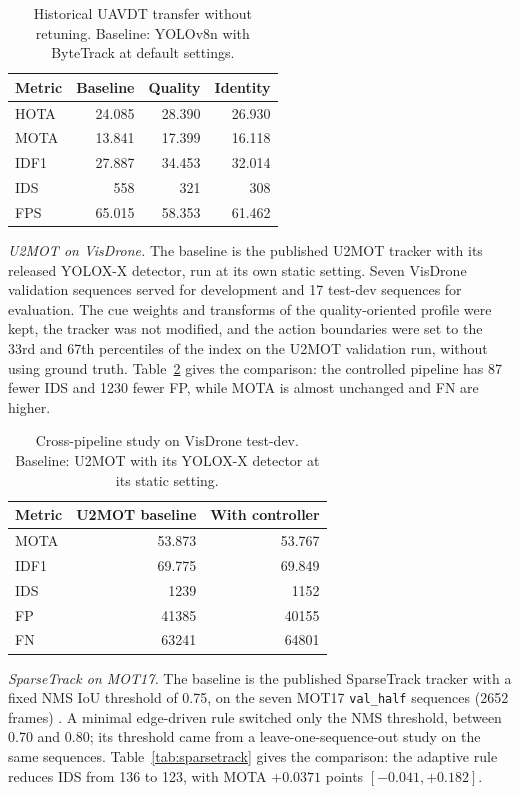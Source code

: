 \documentclass[journal]{new-aiaa}
\begin{document}
\begin{table}[htbp]
\caption{Historical UAVDT transfer without retuning. Baseline: YOLOv8n with
ByteTrack at default settings.}
\label{tab:hist-uavdt}
\centering\footnotesize
\setlength{\tabcolsep}{4pt}
\begin{tabular}{@{}lrrr@{}}
\toprule
Metric & Baseline & Quality & Identity\\
\midrule
HOTA & 24.085 & 28.390 & 26.930\\
MOTA & 13.841 & 17.399 & 16.118\\
IDF1 & 27.887 & 34.453 & 32.014\\
IDS & 558 & 321 & 308\\
FPS & 65.015 & 58.353 & 61.462\\
\bottomrule
\end{tabular}
\end{table}

\emph{U2MOT on VisDrone.} The baseline is the published U2MOT tracker
\cite{liu2023u2mot} with its released YOLOX-X detector, run
at its own static setting. Seven VisDrone validation sequences served for
development and 17 test-dev sequences for evaluation. The cue weights and
transforms of the quality-oriented profile were kept, the tracker was not
modified, and the action boundaries were set to the 33rd and 67th percentiles
of the index on the U2MOT validation run, without using ground truth.
Table~\ref{tab:u2mot} gives the comparison: the controlled pipeline has 87
fewer IDS and 1230 fewer FP, while MOTA is almost unchanged and FN are higher.

\begin{table}[htbp]
\caption{Cross-pipeline study on VisDrone test-dev. Baseline: U2MOT with its
YOLOX-X detector at its static setting.}
\label{tab:u2mot}
\centering\footnotesize
\setlength{\tabcolsep}{4pt}
\begin{tabular}{@{}lrr@{}}
\toprule
Metric & U2MOT baseline & With controller\\
\midrule
MOTA & 53.873 & 53.767\\
IDF1 & 69.775 & 69.849\\
IDS & 1239 & 1152\\
FP & 41385 & 40155\\
FN & 63241 & 64801\\
\bottomrule
\end{tabular}
\end{table}

\emph{SparseTrack on MOT17.} The baseline is the published SparseTrack tracker
\cite{liu2025sparsetrack} with a fixed NMS IoU threshold of 0.75, on the seven
MOT17 \texttt{val\_half} sequences (2652 frames) \cite{dendorfer2021motchallenge}.
A minimal edge-driven rule switched only the NMS threshold, between 0.70 and
0.80; its threshold came from a leave-one-sequence-out study on the same
sequences. Table~\ref{tab:sparsetrack} gives the comparison: the adaptive rule
reduces IDS from 136 to 123, with MOTA $+0.0371$ points $[-0.041, +0.182]$.
\end{document}
